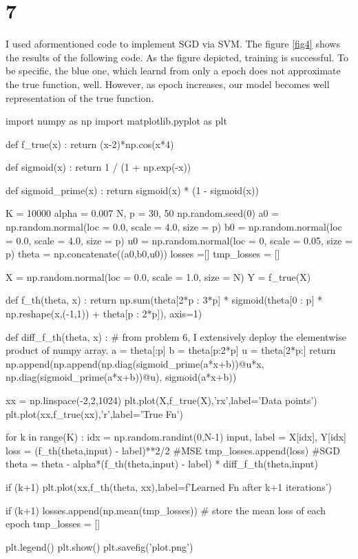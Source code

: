 \documentclass[10pt]{article}
\begin{document}
\section*{7}
I used aformentioned code to implement SGD via SVM. The figure \ref{fig4} shows the results of the following code. As the figure depicted, training is successful. To be specific, the blue one, which learnd from only a epoch does not approximate the true function, well. However, as epoch increases, our model becomes well representation of the true function.  
\begin{python}
import numpy as np
import matplotlib.pyplot as plt

def f_true(x) :
    return (x-2)*np.cos(x*4)

def sigmoid(x) :
    return 1 / (1 + np.exp(-x))

def sigmoid_prime(x) :
    return sigmoid(x) * (1 - sigmoid(x))

K = 10000
alpha = 0.007
N, p = 30, 50
np.random.seed(0)
a0 = np.random.normal(loc = 0.0, scale = 4.0, size = p)
b0 = np.random.normal(loc = 0.0, scale = 4.0, size = p)
u0 = np.random.normal(loc = 0, scale = 0.05, size = p)
theta = np.concatenate((a0,b0,u0))
losses =[]
tmp_losses = []

X = np.random.normal(loc = 0.0, scale = 1.0, size = N)
Y = f_true(X)

def f_th(theta, x) :
    return np.sum(theta[2*p : 3*p] * sigmoid(theta[0 : p] * np.reshape(x,(-1,1)) + theta[p : 2*p]), axis=1)

def diff_f_th(theta, x) : # from problem 6, I extensively deploy the elementwise product of numpy array.
    a = theta[:p]
    b = theta[p:2*p]
    u = theta[2*p:]
    return np.append(np.append(np.diag(sigmoid_prime(a*x+b))@u*x, np.diag(sigmoid_prime(a*x+b))@u), sigmoid(a*x+b))

xx = np.linspace(-2,2,1024)
plt.plot(X,f_true(X),'rx',label='Data points')
plt.plot(xx,f_true(xx),'r',label='True Fn')

for k in range(K) :
    idx = np.random.randint(0,N-1)
    input, label = X[idx], Y[idx]
    loss = (f_th(theta,input) - label)**2/2 #MSE
    tmp_losses.append(loss)
    #SGD
    theta = theta - alpha*(f_th(theta,input) - label) * diff_f_th(theta,input)
    
    if (k+1)%
        plt.plot(xx,f_th(theta, xx),label=f'Learned Fn after {k+1} iterations')

    if (k+1)%
        losses.append(np.mean(tmp_losses)) # store the mean loss of each epoch
        tmp_losses = []

plt.legend()
plt.show()
plt.savefig('plot.png')
\end{python}
\end{document}
